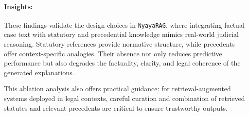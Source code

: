 \paragraph{Insights:}
These findings validate the design choices in \texttt{NyayaRAG}, where integrating factual case text with statutory and precedential knowledge mimics real-world judicial reasoning. Statutory references provide normative structure, while precedents offer context-specific analogies. Their absence not only reduces predictive performance but also degrades the factuality, clarity, and legal coherence of the generated explanations.

This ablation analysis also offers practical guidance: for retrieval-augmented systems deployed in legal contexts, careful curation and combination of retrieved statutes and relevant precedents are critical to ensure trustworthy outputs.
